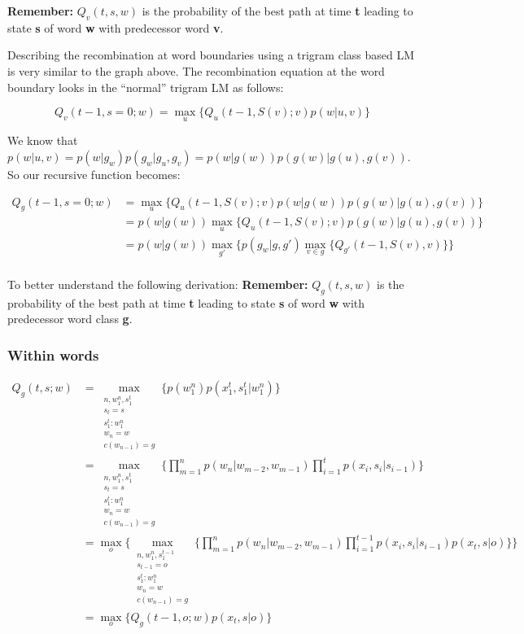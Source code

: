 \textbf{Remember:}
$Q_v(t,s,w)$ is the probability of the best path at time \textbf{t} leading to 
state \textbf{s} of word \textbf{w} with predecessor word \textbf{v}.

Describing the recombination at word boundaries using a trigram class based LM is very similar to the graph above.
The recombination equation at the word boundary looks in the ``normal'' trigram LM as follows:

\[
Q_v(t-1,s=0;w) = \max_u\{Q_u(t-1,S(v);v)p(w|u,v)\}
\]

We know that $p(w|u,v) = p(w|g_w)p(g_w|g_u,g_v) = p(w|g(w))p(g(w)|g(u),g(v))$. So our recursive function becomes:

\begin{align*}
	Q_g(t-1,s=0;w) &= \max_u\{Q_u(t-1,S(v);v)p(w|g(w))p(g(w)|g(u),g(v))\} \\ 
	&= p(w|g(w))\max_u\{Q_u(t-1,S(v);v)p(g(w)|g(u),g(v))\} \\
	&= p(w|g(w))\max_{g'}\{p(g_w|g,g')\max_{v \in g}\{Q_{g'}(t-1,S(v),v)\}\} \\
\end{align*}

To better understand the following derivation: 
\textbf{Remember:}
$Q_g(t,s,w)$ is the probability of the best path at time \textbf{t} leading to 
state \textbf{s} of word \textbf{w} with predecessor word class \textbf{g}.

\subsubsection*{Within words} %
\label{ssub:within_words}

\begin{align*}
	Q_g(t,s;w) &= \max_{\substack{n, w_1^n, s_1^{t} \\ s_{t}=s \\ s_1^{t} : w_1^{n} \\ w_n = w \\ c(w_{n-1}) = g}} \{ p(w_1^n)p(x_1^t, s_1^t | w_1^n)\} \\ 
	&= \max_{\substack{n, w_1^n, s_1^{t} \\ s_{t}=s \\ s_1^{t} : w_1^{n} \\ w_n = w \\ c(w_{n-1}) = g}} \{\prod_{m=1}^n p(w_n|w_{m-2},w_{m-1}) \prod_{i=1}^{t} p(x_i, s_i | s_{i-1})\} \\
	&= \max_o \{ \max_{\substack{ n, w_1^n, s_1^{t-1} \\ s_{t-1}=o \\ s_1^t : w_1^n \\ w_n = w \\ c(w_{n-1}) = g}} \{\prod_{m=1}^n p(w_n|w_{m-2},w_{m-1})\prod_{i=1}^{t-1} p(x_i, s_i | s_{i-1}) p(x_t, s|o)       \}\}\\
	&= \max_o \{Q_g(t-1,o;w) p(x_t, s|o) \}
\end{align*}

